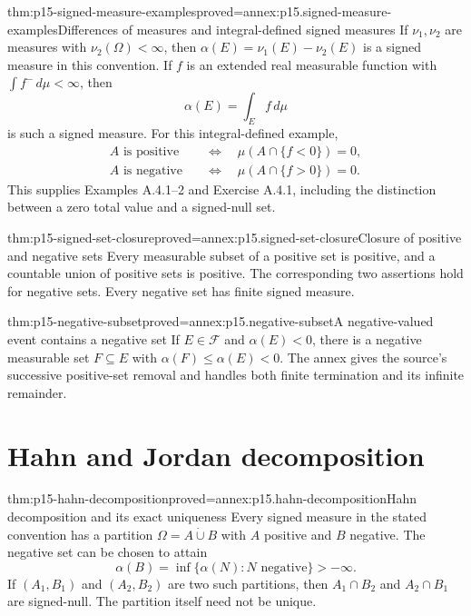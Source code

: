 \begin{hbtheorem}{thm:p15-signed-measure-examples}{proved=annex:p15.signed-measure-examples}{Differences of measures and integral-defined signed measures}
If \(\nu_1,\nu_2\) are measures with \(\nu_2(\Omega)<\infty\), then
\(\alpha(E)=\nu_1(E)-\nu_2(E)\) is a signed measure in this convention.
If \(f\) is an extended real measurable function with
\(\int f^-\,d\mu<\infty\), then
\[
                            \alpha(E)=\int_E f\,d\mu
\]
is such a signed measure. For this integral-defined example,
\[
 \begin{aligned}
 A\text{ is positive}&\quad\Longleftrightarrow\quad
                           \mu(A\cap\{f<0\})=0,\\
 A\text{ is negative}&\quad\Longleftrightarrow\quad
                           \mu(A\cap\{f>0\})=0.
 \end{aligned}
\]
This supplies Examples A.4.1--2 and Exercise A.4.1, including the
distinction between a zero total value and a signed-null set.
\end{hbtheorem}

\begin{hblemma}{thm:p15-signed-set-closure}{proved=annex:p15.signed-set-closure}{Closure of positive and negative sets}
Every measurable subset of a positive set is positive, and a countable
union of positive sets is positive. The corresponding two assertions
hold for negative sets. Every negative set has finite signed measure.
\end{hblemma}

\begin{hblemma}{thm:p15-negative-subset}{proved=annex:p15.negative-subset}{A negative-valued event contains a negative set}
If \(E\in\mathcal F\) and \(\alpha(E)<0\), there is a negative measurable
set \(F\subseteq E\) with \(\alpha(F)\leq\alpha(E)<0\).
The annex gives the source's successive positive-set removal and handles
both finite termination and its infinite remainder.
\end{hblemma}

\section{Hahn and Jordan decomposition}
\label{sec:p15-hahn-jordan}

\begin{hbtheorem}{thm:p15-hahn-decomposition}{proved=annex:p15.hahn-decomposition}{Hahn decomposition and its exact uniqueness}
Every signed measure in the stated convention has a partition
\(\Omega=A\mathbin{\dot\cup}B\) with \(A\) positive and \(B\) negative.
The negative set can be chosen to attain
\[
                    \alpha(B)=\inf\{\alpha(N):N\text{ negative}\}>-\infty.
\]
If \((A_1,B_1)\) and \((A_2,B_2)\) are two such partitions, then
\(A_1\cap B_2\) and \(A_2\cap B_1\) are signed-null.
The partition itself need not be unique.
\end{hbtheorem}

